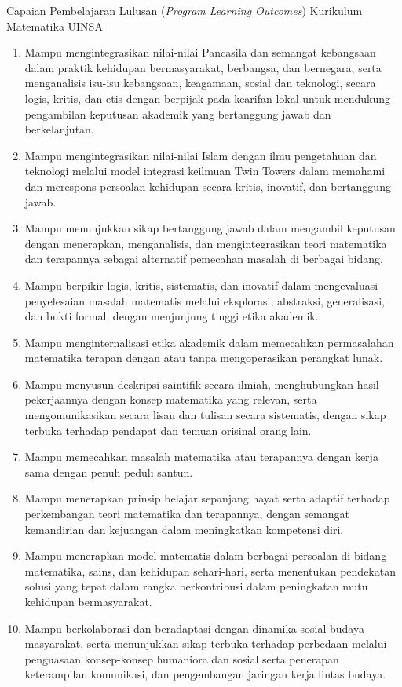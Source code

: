 \documentclass[aspectratio=169,11pt]{beamer}
\begin{document}
\begin{frame}[allowframebreaks]{Capaian Pembelajaran Lulusan (\textit{Program Learning Outcomes}) Kurikulum Matematika UINSA}

\begin{enumerate}
\item Mampu mengintegrasikan nilai-nilai Pancasila dan semangat kebangsaan dalam praktik kehidupan bermasyarakat, berbangsa, dan bernegara, serta menganalisis isu-isu kebangsaan, keagamaan, sosial dan teknologi, secara logis, kritis, dan etis dengan berpijak pada kearifan lokal untuk mendukung pengambilan keputusan akademik yang bertanggung jawab dan berkelanjutan.
\item Mampu mengintegrasikan nilai-nilai Islam dengan ilmu pengetahuan dan teknologi melalui model integrasi keilmuan Twin Towers dalam memahami dan merespons persoalan kehidupan secara kritis, inovatif, dan bertanggung jawab.
\item Mampu menunjukkan sikap bertanggung jawab dalam mengambil keputusan dengan menerapkan, menganalisis, dan mengintegrasikan teori matematika dan terapannya sebagai alternatif pemecahan masalah di berbagai bidang.
\item Mampu berpikir logis, kritis, sistematis, dan inovatif dalam mengevaluasi penyelesaian masalah matematis melalui eksplorasi, abstraksi, generalisasi, dan bukti formal, dengan menjunjung tinggi etika akademik.
\item Mampu menginternalisasi etika akademik dalam memecahkan permasalahan matematika terapan dengan atau tanpa mengoperasikan perangkat lunak.
\item Mampu menyusun deskripsi saintifik secara ilmiah, menghubungkan hasil pekerjaannya dengan konsep matematika yang relevan, serta mengomunikasikan secara lisan dan tulisan secara sistematis, dengan sikap terbuka terhadap pendapat dan temuan orisinal orang lain.
\item Mampu memecahkan masalah matematika atau terapannya dengan kerja sama dengan penuh peduli santun.
\item Mampu menerapkan prinsip belajar sepanjang hayat serta adaptif terhadap perkembangan teori matematika dan terapannya, dengan semangat kemandirian dan kejuangan dalam meningkatkan kompetensi diri.
\item 	Mampu menerapkan model matematis dalam berbagai persoalan di bidang matematika, sains, dan kehidupan sehari-hari, serta menentukan pendekatan solusi yang tepat dalam rangka berkontribusi dalam peningkatan mutu kehidupan bermasyarakat.
\item Mampu berkolaborasi dan beradaptasi dengan dinamika sosial budaya masyarakat, serta menunjukkan sikap terbuka terhadap perbedaan melalui penguasaan konsep-konsep humaniora dan sosial serta penerapan keterampilan komunikasi, dan pengembangan jaringan kerja lintas budaya.
\end{enumerate}

\end{frame}
\end{document}
